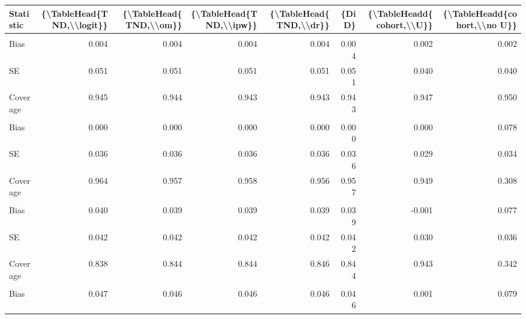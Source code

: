 \begin{table}
\centering
\begin{tabular}{lddddddd}
\toprule
Statistic & \{\textbackslash{}TableHead\{TND,\textbackslash{}\textbackslash{}logit\}\} & \{\textbackslash{}TableHead\{TND,\textbackslash{}\textbackslash{}om\}\} & \{\textbackslash{}TableHead\{TND,\textbackslash{}\textbackslash{}ipw\}\} & \{\textbackslash{}TableHead\{TND,\textbackslash{}\textbackslash{}dr\}\} & \{DiD\} & \{\textbackslash{}TableHeadd\{cohort,\textbackslash{}\textbackslash{}U\}\} & \{\textbackslash{}TableHeadd\{cohort,\textbackslash{}\textbackslash{}no U\}\}\\
\midrule
\addlinespace[0.3em]
\\
\hspace{1em}Bias & 0.004 & 0.004 & 0.004 & 0.004 & 0.004 & 0.002 & 0.002\\
\hspace{1em}SE & 0.051 & 0.051 & 0.051 & 0.051 & 0.051 & 0.040 & 0.040\\
\hspace{1em}Coverage & 0.945 & 0.944 & 0.943 & 0.943 & 0.943 & 0.947 & 0.950\\
\addlinespace[0.3em]
\\
\hspace{1em}Bias & 0.000 & 0.000 & 0.000 & 0.000 & 0.000 & 0.000 & 0.078\\
\hspace{1em}SE & 0.036 & 0.036 & 0.036 & 0.036 & 0.036 & 0.029 & 0.034\\
\hspace{1em}Coverage & 0.964 & 0.957 & 0.958 & 0.956 & 0.957 & 0.949 & 0.308\\
\addlinespace[0.3em]
\\
\hspace{1em}Bias & 0.040 & 0.039 & 0.039 & 0.039 & 0.039 & -0.001 & 0.077\\
\hspace{1em}SE & 0.042 & 0.042 & 0.042 & 0.042 & 0.042 & 0.030 & 0.036\\
\hspace{1em}Coverage & 0.838 & 0.844 & 0.844 & 0.846 & 0.844 & 0.943 & 0.342\\
\addlinespace[0.3em]
\\
\hspace{1em}Bias & 0.047 & 0.046 & 0.046 & 0.046 & 0.046 & 0.001 & 0.079\\

\end{tabular}
\end{table}
